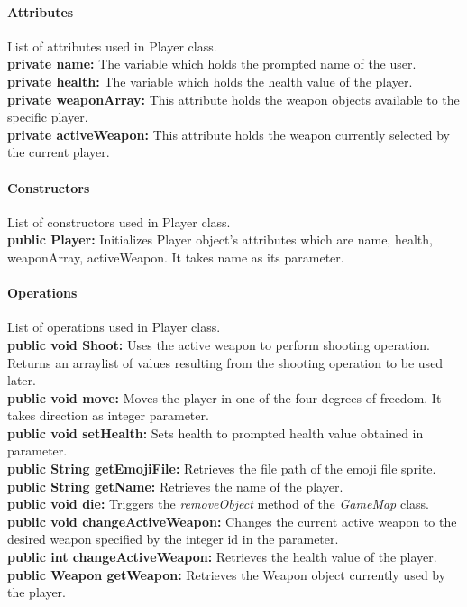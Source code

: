 \documentclass[12pt]{article} %
\begin{document}
\paragraph{Attributes\\}

List of attributes used in Player class.\\
\textbf{private name:} The variable which holds the prompted name of the user.\\
\textbf{private health:} The variable which holds the health value of the player.\\
\textbf{private weaponArray:} This attribute holds the weapon objects available to the specific player.\\
\textbf{private activeWeapon:} This attribute holds the weapon currently selected by the current player.

\paragraph{Constructors \\}
List of constructors used in Player class.\\
\textbf{public Player:} Initializes Player object's attributes which are name, health, weaponArray, activeWeapon. It takes name as its parameter.

\paragraph{Operations \\}
List of operations used in Player class.\\
\textbf{public void Shoot:} Uses the active weapon to perform shooting operation. Returns an arraylist of values resulting from the shooting operation to be used later.\\
\textbf{public void move:} Moves the player in one of the four degrees of freedom.  It takes direction as integer parameter. \\
\textbf{public void setHealth:} Sets health to prompted health value obtained in parameter. \\
\textbf{public String getEmojiFile:} Retrieves the file path of the emoji file sprite. \\
\textbf{public String getName:} Retrieves the name of the player. \\
\textbf{public void die:} Triggers the \textit{removeObject} method of the \textit{GameMap} class. \\
\textbf{public void changeActiveWeapon:} Changes the current active weapon to the desired weapon specified by the integer id in the parameter. \\
\textbf{public int changeActiveWeapon:} Retrieves the health value of the player. \\
\textbf{public Weapon getWeapon:} Retrieves the Weapon object currently used by the player. 
\end{document}
